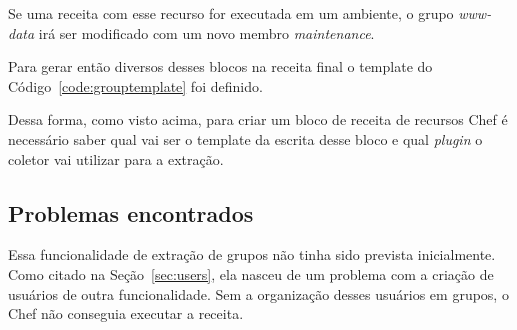 Se uma receita com esse recurso for executada em um ambiente, o grupo \textit{www-data}
irá ser modificado com um novo membro \textit{maintenance}.

Para gerar então diversos desses blocos na receita final o template do Código~\ref{code:grouptemplate} foi definido.

\noindent\begin{minipage}{\textwidth}
  \lstset{style=shell}
  
\end{minipage}\hfill

Dessa forma, como visto acima, para criar um bloco de receita de recursos Chef é
necessário saber qual vai ser o template da escrita desse bloco e qual \textit{plugin}
o coletor vai utilizar para a extração.

\subsection{Problemas encontrados}

Essa funcionalidade de extração de grupos não tinha sido prevista inicialmente.
Como citado na Seção~\ref{sec:users}, ela nasceu de um problema com a criação de usuários
de outra funcionalidade. Sem a organização desses usuários em grupos, o Chef não conseguia
executar a receita.

